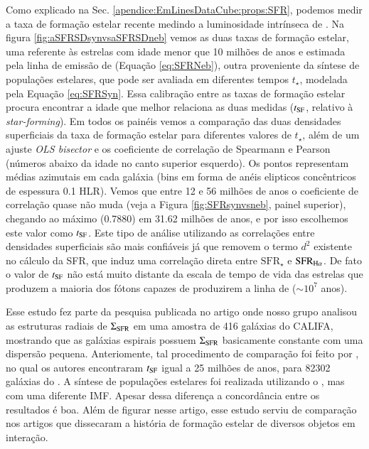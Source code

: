 Como explicado na Sec. \ref{apendice:EmLinesDataCube:props:SFR}, podemos medir a taxa de formação estelar recente medindo a luminosidade intrínseca de \Ha. Na figura \ref{fig:aSFRSDsynvsaSFRSDneb} vemos as duas taxas de formação estelar, uma referente às estrelas com idade menor que 10 milhões de anos e estimada pela linha de emissão de \Ha (Equação \ref{eq:SFRNeb}), outra proveniente da síntese de populações estelares, que pode ser avaliada em diferentes tempos $t_\star$, modelada pela Equação \ref{eq:SFRSyn}. Essa calibração entre as taxas de formação estelar procura encontrar a idade que melhor relaciona as duas medidas ($t_{\rm SF}$, relativo à {\em star-forming}). Em todos os painéis vemos a comparação das duas densidades superficiais da taxa de formação estelar para diferentes valores de $t_\star$, além de um ajuste {\em OLS bisector} e os coeficiente de correlação de Spearmann e Pearson (números abaixo da idade no canto superior esquerdo). Os pontos representam médias azimutais em cada galáxia (bins em forma de anéis elipticos concêntricos de espessura 0.1 HLR). Vemos que entre 12 e 56 milhões de anos o coeficiente de correlação quase não muda (veja a Figura \ref{fig:SFRsynvsneb}, painel superior), chegando ao máximo (0.7880) em 31.62 milhões de anos, e por isso escolhemos este valor como $t_{\rm SF}$. Este tipo de análise utilizando as correlações entre densidades superficiais são mais confiáveis já que removem o termo $d^2$ existente no cálculo da SFR, que induz uma correlação direta entre $\mathrm{SFR}_\star$ e $\mathrm{SFR}_{\Ha}$. De fato o valor de $t_{\rm SF}$ não está muito distante da escala de tempo de vida das estrelas que produzem a maioria dos fótons capazes de produzirem a linha de \Ha ($\sim10^7$ anos).

Esse estudo fez parte da pesquisa publicada no artigo \citep{GonzalezDelgado.etal.2016a} onde nosso grupo analisou as estruturas radiais de $\Sigma_{\rm SFR}$ em uma amostra de 416 galáxias do CALIFA, mostrando que as galáxias espirais possuem $\Sigma_{\rm SFR}$ basicamente constante com uma dispersão pequena. Anteriomente, tal procedimento de comparação foi feito por \citet{Asari.etal.2007a}, no qual os autores encontraram $t_{\rm SF}$ igual a 25 milhões de anos, para 82302 galáxias do \SDSS. A síntese de populações estelares foi realizada utilizando o \starlight, mas com uma diferente IMF. Apesar dessa diferença a concordância entre os resultados é boa. Além de figurar nesse artigo, esse estudo serviu de comparação nos artigos \citet{CortijoFerrero.etal.2017a, CortijoFerrero.etal.2017b, CortijoFerrero.etal.2017c} que dissecaram a história de formação estelar de diversos objetos em interação.

